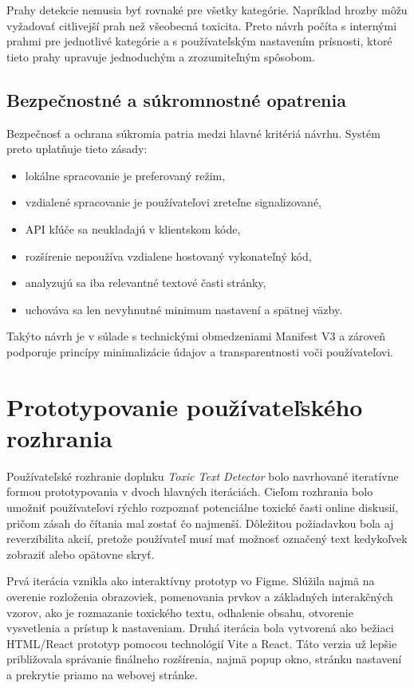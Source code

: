 Prahy detekcie nemusia byť rovnaké pre všetky kategórie. Napríklad hrozby môžu vyžadovať citlivejší prah než všeobecná toxicita. Preto návrh počíta s internými prahmi pre jednotlivé kategórie a s používateľským nastavením prísnosti, ktoré tieto prahy upravuje jednoduchým a zrozumiteľným spôsobom.

\subsection{Bezpečnostné a súkromnostné opatrenia}
Bezpečnosť a ochrana súkromia patria medzi hlavné kritériá návrhu. Systém preto uplatňuje tieto zásady:
\begin{itemize}
  \item lokálne spracovanie je preferovaný režim,
  \item vzdialené spracovanie je používateľovi zreteľne signalizované,
  \item API kľúče sa neukladajú v klientskom kóde,
  \item rozšírenie nepoužíva vzdialene hostovaný vykonateľný kód,
  \item analyzujú sa iba relevantné textové časti stránky,
  \item uchováva sa len nevyhnutné minimum nastavení a spätnej väzby.
\end{itemize}

Takýto návrh je v súlade s technickými obmedzeniami Manifest V3 a zároveň podporuje princípy minimalizácie údajov a transparentnosti voči používateľovi.

\section{Prototypovanie používateľského rozhrania}
Používateľské rozhranie doplnku \textit{Toxic Text Detector} bolo navrhované iteratívne formou prototypovania v dvoch hlavných iteráciách. Cieľom rozhrania bolo umožniť používateľovi rýchlo rozpoznať potenciálne toxické časti online diskusií, pričom zásah do čítania mal zostať čo najmenší. Dôležitou požiadavkou bola aj reverzibilita akcií, pretože používateľ musí mať možnosť označený text kedykoľvek zobraziť alebo opätovne skryť.

Prvá iterácia vznikla ako interaktívny prototyp vo Figme. Slúžila najmä na overenie rozloženia obrazoviek, pomenovania prvkov a základných interakčných vzorov, ako je rozmazanie toxického textu, odhalenie obsahu, otvorenie vysvetlenia a prístup k nastaveniam. Druhá iterácia bola vytvorená ako bežiaci HTML/React prototyp pomocou technológií Vite a React. Táto verzia už lepšie približovala správanie finálneho rozšírenia, najmä popup okno, stránku nastavení a prekrytie priamo na webovej stránke.

